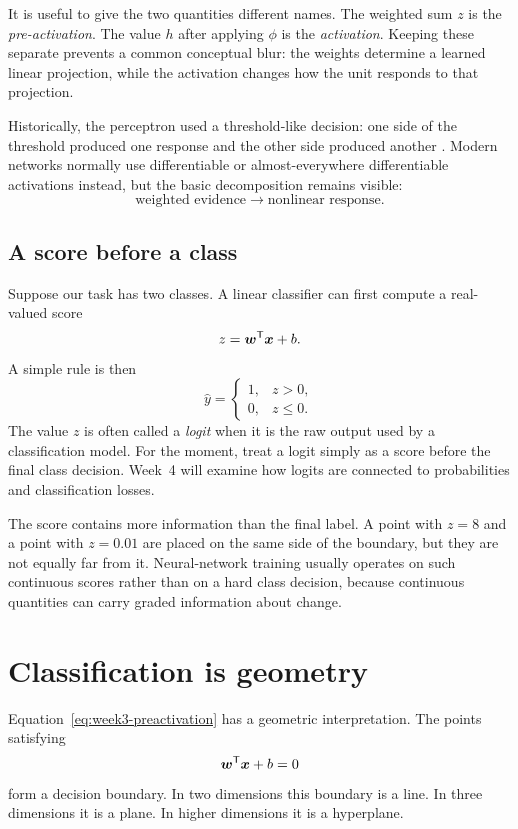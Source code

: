 It is useful to give the two quantities different names. The weighted sum \(z\) is the \emph{pre-activation}. The value \(h\) after applying \(\phi\) is the \emph{activation}. Keeping these separate prevents a common conceptual blur: the weights determine a learned linear projection, while the activation changes how the unit responds to that projection.

Historically, the perceptron used a threshold-like decision: one side of the threshold produced one response and the other side produced another \parencite{rosenblatt1958}. Modern networks normally use differentiable or almost-everywhere differentiable activations instead, but the basic decomposition remains visible:
\[
  \text{weighted evidence} \longrightarrow \text{nonlinear response}.
\]

\subsection{A score before a class}

Suppose our task has two classes. A linear classifier can first compute a real-valued score
\[
  z = \bm{w}^{\mathsf T}\bm{x}+b.
\]
A simple rule is then
\[
  \hat y =
  \begin{cases}
    1, & z>0,\\
    0, & z\le 0.
  \end{cases}
\]
The value \(z\) is often called a \emph{logit} when it is the raw output used by a classification model. For the moment, treat a logit simply as a score before the final class decision. Week~4 will examine how logits are connected to probabilities and classification losses.

The score contains more information than the final label. A point with \(z=8\) and a point with \(z=0.01\) are placed on the same side of the boundary, but they are not equally far from it. Neural-network training usually operates on such continuous scores rather than on a hard class decision, because continuous quantities can carry graded information about change.

\section{Classification is geometry}

Equation~\eqref{eq:week3-preactivation} has a geometric interpretation. The points satisfying
\begin{equation}
  \bm{w}^{\mathsf T}\bm{x}+b=0
  \label{eq:week3-boundary}
\end{equation}
form a decision boundary. In two dimensions this boundary is a line. In three dimensions it is a plane. In higher dimensions it is a hyperplane.

